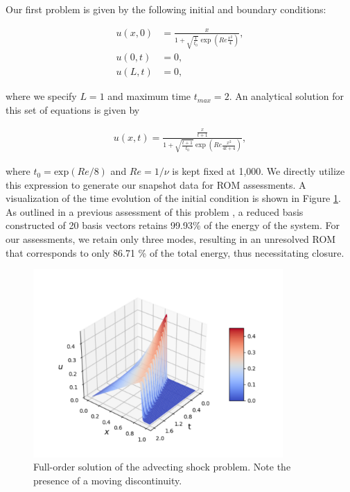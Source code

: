 \documentclass[preprint,12pt]{elsarticle}
\begin{document}
Our first problem is given by the following initial and boundary conditions:
\begin{linenomath*}
\begin{align}
u(x, 0) &=\frac{x}{1+\sqrt{\frac{1}{t_{0}}} \exp \left(R e \frac{x^{2}}{4}\right)}, \\ 
u(0, t) &=0, \\ 
u(L, t) &=0,
\end{align}
\end{linenomath*}
where we specify $L=1$ and maximum time $t_{max}=2$. An analytical solution for this set of equations is given by
\begin{linenomath*}
\begin{align}
u(x, t)=\frac{\frac{x}{t+1}}{1+\sqrt{\frac{t+1}{t_{0}}} \exp \left(R e \frac{x^{2}}{4 t+4}\right)},
\end{align}
\end{linenomath*}
where $t_0=\text{exp}(Re/8)$ and $Re = 1/\nu$ is kept fixed at 1,000. We directly utilize this expression to generate our snapshot data for ROM assessments. A visualization of the time evolution of the initial condition is shown in Figure \ref{Figure1}. As outlined in a previous assessment of this problem \cite{san2018neural}, a reduced basis constructed of 20 basis vectors retains 99.93\% of the energy of the system. For  our assessments, we retain only three modes,  resulting in an unresolved ROM that corresponds to only 86.71 \% of the total energy, thus necessitating closure. 

\begin{figure}
	\centering
	\includegraphics[width=0.85\textwidth]{Figure_1.pdf}
	\caption{Full-order solution of the advecting shock problem. Note the presence of a moving discontinuity.}
	\label{Figure1}
\end{figure}
\end{document}
